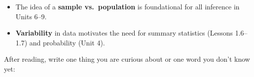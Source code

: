 \documentclass[10pt]{article}
\begin{document}
\begin{tcolorbox}[colback=greenbg, colframe=greenacc, boxrule=0.8pt, arc=2mm,
    left=4mm, right=4mm, top=3mm, bottom=3mm]
\small
\begin{itemize}[leftmargin=1.3em, itemsep=8pt]
  \item The idea of a \textbf{sample vs.\ population} is foundational for all
        inference in Units 6--9.
  \item \textbf{Variability} in data motivates the need for summary statistics
        (Lessons 1.6--1.7) and probability (Unit 4).
\end{itemize}
\end{tcolorbox}

\vspace{0.2in}

\noindent\textcolor{slate}{\small After reading, write one thing you are curious about or one word you
don't know yet:}\\[6pt]
\\[4pt]
\writeline
\end{document}
